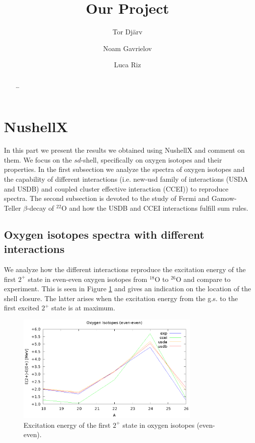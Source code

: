 \documentclass[12pt,a4paper]{article}
\begin{document}
\title{Our Project}

\author{Tor Dj\"{a}rv \and Noam Gavrielov\and Luca Riz}


\begin{abstract}
\dots
\end{abstract}
%
\section{NushellX} \label{NushellX}
%
%
In this part we present the results we obtained using NushellX \cite{nush} and comment on them. We focus  on the $sd$-shell, specifically on oxygen isotopes and their properties. In the first subsection we analyze the spectra of oxygen isotopes and the capability of different interactions (i.e. new-usd family of interactions \cite{usd} (USDA and USDB) and coupled cluster effective interaction \cite{ccei} (CCEI)) to reproduce spectra. The second subsection is devoted to the study of Fermi and Gamow-Teller $\beta$-decay of $^{22}$O and how the USDB and CCEI interactions fulfill sum rules.

\subsection{Oxygen isotopes spectra with different interactions} \label{Oxygen}
%
We analyze how the different interactions reproduce the excitation energy of the first $2^+$ state in even-even oxygen isotopes from $^{18}$O to $^{26}$O and compare to experiment. This is seen in Figure \ref{fig:2+/0+}   and gives an indication on the location of the shell closure. The latter  arises when the excitation energy from the g.s. to the first excited $2^+$ state is at maximum.

\begin{figure}[htb!]
\centering
\includegraphics[width=0.8\textwidth]{2+_over_0+.eps}
\caption{Excitation energy of the first $2^+$ state in oxygen isotopes (even-even).}
\label{fig:2+/0+}
\end{figure}
\end{document}
